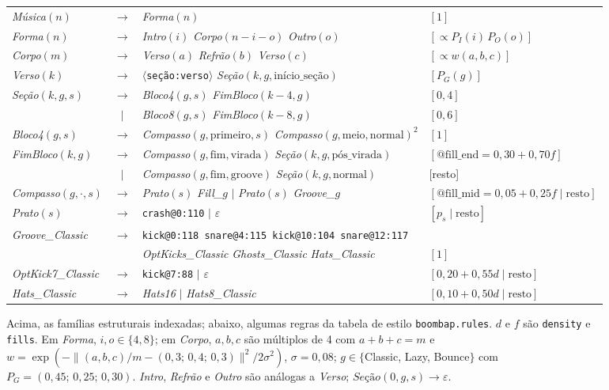 \documentclass{article}
\newcommand{\nt}[1]{\textit{#1}}
\newcommand{\tm}[1]{\texttt{#1}}
\begin{document}
\begin{figure}[t]
\footnotesize
\centering
\begin{tabular}{@{}l@{\;}c@{\;}l@{\quad}l@{}}
\toprule
\nt{Música}$(n)$ & $\to$ & \nt{Forma}$(n)$ & $[1]$ \\
\nt{Forma}$(n)$ & $\to$ & \nt{Intro}$(i)$ \nt{Corpo}$(n{-}i{-}o)$ \nt{Outro}$(o)$ & $[\propto P_I(i)\,P_O(o)]$ \\
\nt{Corpo}$(m)$ & $\to$ & \nt{Verso}$(a)$ \nt{Refrão}$(b)$ \nt{Verso}$(c)$ & $[\propto w(a,b,c)]$ \\
\nt{Verso}$(k)$ & $\to$ & \tm{$\langle$seção:verso$\rangle$} \nt{Seção}$(k,g,\textrm{início\_seção})$ & $[P_G(g)]$ \\
\nt{Seção}$(k,g,s)$ & $\to$ & \nt{Bloco4}$(g,s)$ \nt{FimBloco}$(k{-}4,g)$ & $[0{,}4]$ \\
 & $\mid$ & \nt{Bloco8}$(g,s)$ \nt{FimBloco}$(k{-}8,g)$ & $[0{,}6]$ \\
\nt{Bloco4}$(g,s)$ & $\to$ & \nt{Compasso}$(g,\textrm{primeiro},s)$ \nt{Compasso}$(g,\textrm{meio},\textrm{normal})^{2}$ & $[1]$ \\
\nt{FimBloco}$(k,g)$ & $\to$ & \nt{Compasso}$(g,\textrm{fim},\textrm{virada})$ \nt{Seção}$(k,g,\textrm{pós\_virada})$ & $[\textrm{@fill\_end}=0{,}30+0{,}70f]$ \\
 & $\mid$ & \nt{Compasso}$(g,\textrm{fim},\textrm{groove})$ \nt{Seção}$(k,g,\textrm{normal})$ & [resto] \\
\nt{Compasso}$(g,\cdot,s)$ & $\to$ & \nt{Prato}$(s)$ \nt{Fill\_}$g$ $\mid$ \nt{Prato}$(s)$ \nt{Groove\_}$g$ & $[\textrm{@fill\_mid}=0{,}05+0{,}25f \mid \textrm{resto}]$ \\
\nt{Prato}$(s)$ & $\to$ & \tm{crash@0:110} $\mid$ $\varepsilon$ & $[p_s \mid \textrm{resto}]$ \\
\midrule
\nt{Groove\_Classic} & $\to$ & \tm{kick@0:118 snare@4:115 kick@10:104 snare@12:117} & \\
 & & \nt{OptKicks\_Classic} \nt{Ghosts\_Classic} \nt{Hats\_Classic} & $[1]$ \\
\nt{OptKick7\_Classic} & $\to$ & \tm{kick@7:88} $\mid$ $\varepsilon$ & $[0{,}20+0{,}55d \mid \textrm{resto}]$ \\
\nt{Hats\_Classic} & $\to$ & \nt{Hats16} $\mid$ \nt{Hats8\_Classic} & $[0{,}10+0{,}50d \mid \textrm{resto}]$ \\
\bottomrule
\end{tabular}
\caption{Acima, as famílias estruturais indexadas; abaixo, algumas regras da tabela de estilo
\tm{boombap.rules}. $d$ e $f$ são \tm{density} e \tm{fills}. Em \nt{Forma}, $i,o\in\{4,8\}$; em
\nt{Corpo}, $a,b,c$ são múltiplos de 4 com $a{+}b{+}c=m$ e
$w=\exp(-\lVert (a,b,c)/m-(0{,}3;\,0{,}4;\,0{,}3)\rVert^2/2\sigma^2)$, $\sigma=0{,}08$;
$g\in\{$Classic, Lazy, Bounce$\}$ com $P_G=(0{,}45;\,0{,}25;\,0{,}30)$. \nt{Intro}, \nt{Refrão} e \nt{Outro} são
análogas a \nt{Verso}; $\nt{Seção}(0,g,s)\to\varepsilon$.}
\label{fig:grammar}
\end{figure}
\end{document}
